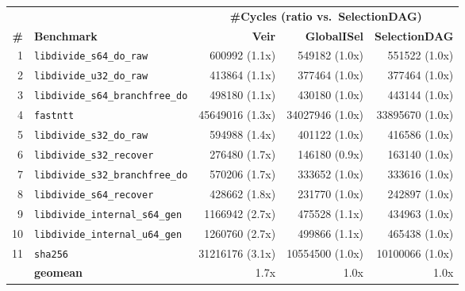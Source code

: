     \centering
    \footnotesize
    \begin{tabular}{r l r r r }
        \toprule
        & & \multicolumn{3}{c}{\textbf{\#Cycles (ratio vs.\ SelectionDAG)}} \\
        \cmidrule(lr){3-5}
        \textbf{\#} & \textbf{Benchmark} & \textbf{Veir} & \textbf{GlobalISel} & \textbf{SelectionDAG} \\
        \midrule
        1 & \texttt{libdivide\_s64\_do\_raw} & 600992 (1.1x) & 549182 (1.0x) & 551522 (1.0x) \\
        2 & \texttt{libdivide\_u32\_do\_raw} & 413864 (1.1x) & 377464 (1.0x) & 377464 (1.0x) \\
        3 & \texttt{libdivide\_s64\_branchfree\_do} & 498180 (1.1x) & 430180 (1.0x) & 443144 (1.0x) \\
        4 & \texttt{fastntt} & 45649016 (1.3x) & 34027946 (1.0x) & 33895670 (1.0x) \\
        5 & \texttt{libdivide\_s32\_do\_raw} & 594988 (1.4x) & 401122 (1.0x) & 416586 (1.0x) \\
        6 & \texttt{libdivide\_s32\_recover} & 276480 (1.7x) & 146180 (0.9x) & 163140 (1.0x) \\
        7 & \texttt{libdivide\_s32\_branchfree\_do} & 570206 (1.7x) & 333652 (1.0x) & 333616 (1.0x) \\
        8 & \texttt{libdivide\_s64\_recover} & 428662 (1.8x) & 231770 (1.0x) & 242897 (1.0x) \\
        9 & \texttt{libdivide\_internal\_s64\_gen} & 1166942 (2.7x) & 475528 (1.1x) & 434963 (1.0x) \\
        10 & \texttt{libdivide\_internal\_u64\_gen} & 1260760 (2.7x) & 499866 (1.1x) & 465438 (1.0x) \\
        11 & \texttt{sha256} & 31216176 (3.1x) & 10554500 (1.0x) & 10100066 (1.0x) \\
        \midrule
        & \textbf{geomean} & 1.7x & 1.0x & 1.0x \\
        \bottomrule
    \end{tabular}
    \label{cycles_ratio_table_real}